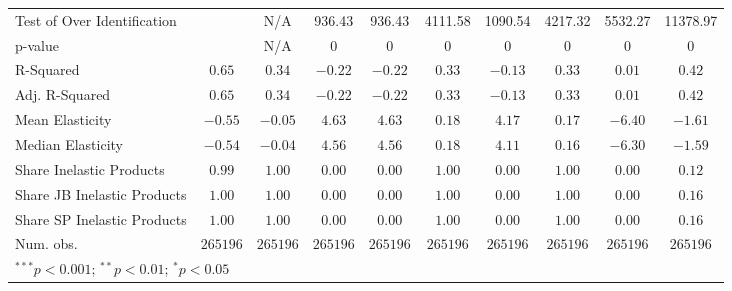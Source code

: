 \begin{tabular}{l c c c c c c c c c}
Test of Over Identification &               & N/A           & 936.43        & 936.43        & 4111.58       & 1090.54       & 4217.32       & 5532.27       & 11378.97      \\
p-value                     &               & N/A           & 0             & 0             & 0             & 0             & 0             & 0             & 0             \\
R-Squared                   & $0.65$        & $0.34$        & $-0.22$       & $-0.22$       & $0.33$        & $-0.13$       & $0.33$        & $0.01$        & $0.42$        \\
Adj. R-Squared              & $0.65$        & $0.34$        & $-0.22$       & $-0.22$       & $0.33$        & $-0.13$       & $0.33$        & $0.01$        & $0.42$        \\
Mean Elasticity             & $-0.55$       & $-0.05$       & $4.63$        & $4.63$        & $0.18$        & $4.17$        & $0.17$        & $-6.40$       & $-1.61$       \\
Median Elasticity           & $-0.54$       & $-0.04$       & $4.56$        & $4.56$        & $0.18$        & $4.11$        & $0.16$        & $-6.30$       & $-1.59$       \\
Share Inelastic Products    & $0.99$        & $1.00$        & $0.00$        & $0.00$        & $1.00$        & $0.00$        & $1.00$        & $0.00$        & $0.12$        \\
Share JB Inelastic Products & $1.00$        & $1.00$        & $0.00$        & $0.00$        & $1.00$        & $0.00$        & $1.00$        & $0.00$        & $0.16$        \\
Share SP Inelastic Products & $1.00$        & $1.00$        & $0.00$        & $0.00$        & $1.00$        & $0.00$        & $1.00$        & $0.00$        & $0.16$        \\
Num. obs.                   & $265196$      & $265196$      & $265196$      & $265196$      & $265196$      & $265196$      & $265196$      & $265196$      & $265196$      \\
\bottomrule
\multicolumn{10}{l}{\scriptsize{$^{***}p<0.001$; $^{**}p<0.01$; $^{*}p<0.05$}}
\end{tabular}

